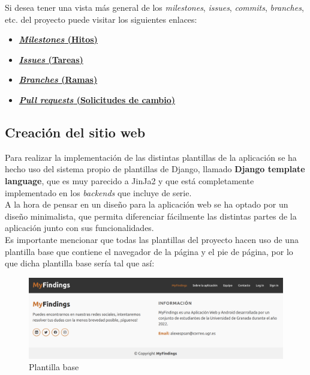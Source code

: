 Si desea tener una vista más general de los \textit{milestones}, \textit{issues},
\textit{commits}, \textit{branches}, etc. del proyecto puede visitar los siguientes enlaces:

\begin{itemize}
    \item \textbf{\href{https://github.com/alexespana/TFG/milestones}{\textit{Milestones} (Hitos)}}
    \item \textbf{\href{https://github.com/alexespana/TFG/issues}{\textit{Issues} (Tareas)}}
    \item \textbf{\href{https://github.com/alexespana/TFG/branches}{\textit{Branches} (Ramas)}}
    \item \textbf{\href{https://github.com/alexespana/TFG/pulls}{\textit{Pull requests} (Solicitudes
    de cambio)}}
\end{itemize}


\subsection{Creación del sitio web}
Para realizar la implementación de las distintas plantillas de la aplicación se ha hecho
uso del sistema propio de plantillas de Django, llamado \textbf{Django template language},
que es muy parecido a JinJa2 y que está completamente implementado en los \textit{backends}
que incluye de serie.\\

A la hora de pensar en un diseño para la aplicación web se ha optado por un diseño
minimalista, que permita diferenciar fácilmente las distintas partes de la aplicación
junto con sus funcionalidades.\\

Es importante mencionar que todas las plantillas del proyecto hacen uso de una plantilla
base que contiene el navegador de la página y el pie de página, por lo que dicha plantilla base
sería tal que así:\\

    \begin{figure}[H]
        \centering
        \includegraphics[scale=0.24]{imagenes/base.png}
        \caption{Plantilla base}
        \label{fig:base}
    \end{figure}

